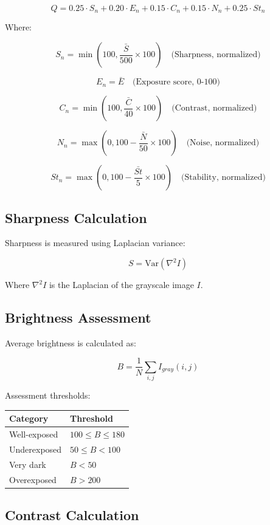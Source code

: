 \documentclass[
  11pt,
]{article}
\begin{document}
\[Q = 0.25 \cdot S_n + 0.20 \cdot E_n + 0.15 \cdot C_n + 0.15 \cdot N_n + 0.25 \cdot St_n\]

Where:

\[S_n = \min\left(100, \frac{\bar{S}}{500} \times 100\right) \quad \text{(Sharpness, normalized)}\]

\[E_n = \bar{E} \quad \text{(Exposure score, 0-100)}\]

\[C_n = \min\left(100, \frac{\bar{C}}{40} \times 100\right) \quad \text{(Contrast, normalized)}\]

\[N_n = \max\left(0, 100 - \frac{\bar{N}}{50} \times 100\right) \quad \text{(Noise, normalized)}\]

\[St_n = \max\left(0, 100 - \frac{\bar{St}}{5} \times 100\right) \quad \text{(Stability, normalized)}\]

\hypertarget{sharpness-calculation}{%
\subsection{Sharpness Calculation}\label{sharpness-calculation}}

Sharpness is measured using Laplacian variance:

\[S = \text{Var}(\nabla^2 I)\]

Where \(\nabla^2 I\) is the Laplacian of the grayscale image \(I\).

\hypertarget{brightness-assessment}{%
\subsection{Brightness Assessment}\label{brightness-assessment}}

Average brightness is calculated as:

\[B = \frac{1}{N} \sum_{i,j} I_{gray}(i,j)\]

Assessment thresholds:

\begin{longtable}[]{@{}ll@{}}
\toprule\noalign{}
Category & Threshold \\
\midrule\noalign{}
\endhead
\bottomrule\noalign{}
\endlastfoot
Well-exposed & \(100 \leq B \leq 180\) \\
Underexposed & \(50 \leq B < 100\) \\
Very dark & \(B < 50\) \\
Overexposed & \(B > 200\) \\
\end{longtable}

\hypertarget{contrast-calculation}{%
\subsection{Contrast Calculation}\label{contrast-calculation}}
\end{document}

